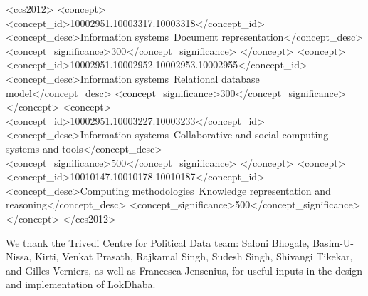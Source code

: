 \documentclass[sigconf]{acmart}
\begin{document}
\begin{CCSXML}
<ccs2012>
   <concept>
       <concept_id>10002951.10003317.10003318</concept_id>
       <concept_desc>Information systems~Document representation</concept_desc>
       <concept_significance>300</concept_significance>
       </concept>
   <concept>
       <concept_id>10002951.10002952.10002953.10002955</concept_id>
       <concept_desc>Information systems~Relational database model</concept_desc>
       <concept_significance>300</concept_significance>
       </concept>
   <concept>
       <concept_id>10002951.10003227.10003233</concept_id>
       <concept_desc>Information systems~Collaborative and social computing systems and tools</concept_desc>
       <concept_significance>500</concept_significance>
       </concept>
   <concept>
       <concept_id>10010147.10010178.10010187</concept_id>
       <concept_desc>Computing methodologies~Knowledge representation and reasoning</concept_desc>
       <concept_significance>500</concept_significance>
       </concept>
 </ccs2012>
\end{CCSXML}




\maketitle








\begin{acks}
We thank the Trivedi Centre for Political Data team: Saloni Bhogale,  Basim-U-Nissa, Kirti, Venkat Prasath, Rajkamal Singh, Sudesh Singh, Shivangi Tikekar, and  Gilles Verniers, as well as Francesca Jensenius, for useful inputs in the design and implementation of LokDhaba.

\end{acks}




\end{document}
